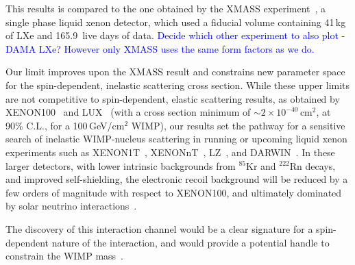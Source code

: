 This results is compared to the one obtained by the XMASS experiment~\cite{Uchida:2014cnn}, a single phase liquid xenon detector, which used a fiducial volume containing 41\,kg of LXe and 165.9~live days of data. \textcolor{blue}{Decide which other experiment to also plot - DAMA LXe? However only XMASS uses the same form factors as we do.}


Our limit improves upon the XMASS result and constrains new parameter space for the spin-dependent, inelastic scattering cross section. While these upper limits are not competitive to spin-dependent, elastic scattering results, as obtained by XENON100~\cite{Aprile:2013doa} and LUX~\cite{Akerib:2016lao} (with a cross section minimum of $\sim2 \times 10^{-40}$\,cm$^{2}$, at 90\% C.L.,  for a 100\,GeV/cm$^2$ WIMP), our results set the pathway for a sensitive search of inelastic WIMP-nucleus scattering in running or upcoming liquid xenon experiments such as XENON1T~\cite{Aprile:2015uzo}, XENONnT~\cite{Aprile:2015uzo},  LZ~\cite{Akerib:2015cja}, and DARWIN~\cite{Aalbers:2016jon}. In these larger detectors, with lower intrinsic backgrounds from $^{85}$Kr and $^{222}$Rn decays, and improved self-shielding, the electronic recoil background will be reduced by a few orders of magnitude with respect to XENON100, and ultimately dominated by solar neutrino interactions~\cite{Baudis:2013qla}. 

The discovery of this interaction channel would be a clear signature for a spin-dependent nature of the interaction, and would provide a potential handle  to constrain the WIMP mass~\cite{Baudis:2013bba}.

